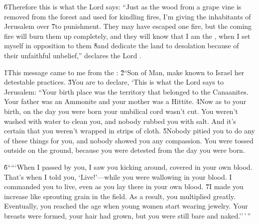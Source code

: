 \v{6}Therefore this is what the Lord  says: ``Just as the wood from a grape vine is removed from the forest and used for kindling fires, I'm giving the inhabitants of Jerusalem over \v{7}to punishment. They may have escaped one fire, but the coming fire will burn them up completely, and they will know that I am the , when I set myself in opposition to them \v{8}and dedicate the land to desolation because of their unfaithful unbelief,'' declares the Lord .

\v{1}This message came to me from the : \v{2}``Son of Man, make known to Israel her detestable practices. \v{3}You are to declare, `This is what the Lord  says to Jerusalem: ``Your birth place was the territory that belonged to the Canaanites. Your father was an Ammonite and your mother was a Hittite. \v{4}Now as to your birth, on the day you were born your umbilical cord wasn't cut. You weren't washed with water to clean you, and nobody rubbed you with salt. And it's certain that you weren't wrapped in strips of cloth. \v{5}Nobody pitied you to do any of these things for you, and nobody showed you any compassion. You were tossed outside on the ground, because you were detested from the day you were born.

\v{6}`````When I passed by you, I saw you kicking around, covered in your own blood. That's when I told you, `Live!'---while you were wallowing in your blood. I commanded you to live, even as you lay there in your own blood. \v{7}I made you increase like sprouting grain in the field. As a result, you multiplied greatly. Eventually, you reached the age when young women start wearing jewelry. Your breasts were formed, your hair had grown, but you were still bare and naked.''\,'\,''

